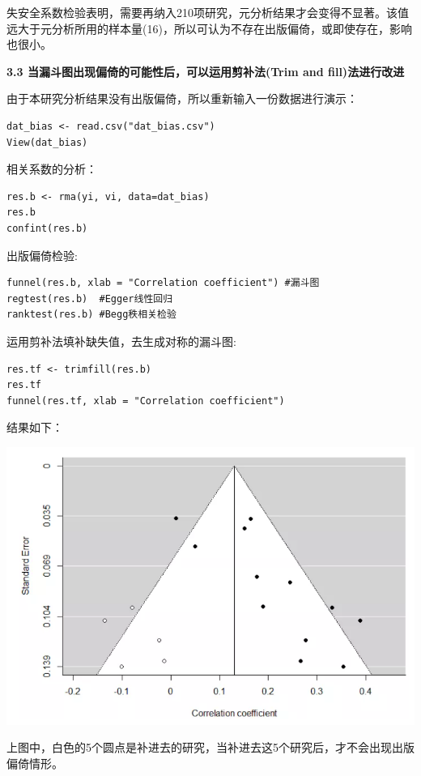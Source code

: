 \documentclass[
]{book}
\begin{document}
失安全系数检验表明，需要再纳入210项研究，元分析结果才会变得不显著。该值远大于元分析所用的样本量(16)，所以可认为不存在出版偏倚，或即使存在，影响也很小。

\textbf{3.3 当漏斗图出现偏倚的可能性后，可以运用剪补法(Trim and fill)法进行改进}

由于本研究分析结果没有出版偏倚，所以重新输入一份数据进行演示：

\begin{verbatim}
dat_bias <- read.csv("dat_bias.csv") 
View(dat_bias)
\end{verbatim}

相关系数的分析：

\begin{verbatim}
res.b <- rma(yi, vi, data=dat_bias) 
res.b 
confint(res.b)  
\end{verbatim}

出版偏倚检验:

\begin{verbatim}
funnel(res.b, xlab = "Correlation coefficient") #漏斗图
regtest(res.b)  #Egger线性回归
ranktest(res.b) #Begg秩相关检验
\end{verbatim}

运用剪补法填补缺失值，去生成对称的漏斗图:

\begin{verbatim}
res.tf <- trimfill(res.b)
res.tf
funnel(res.tf, xlab = "Correlation coefficient")
\end{verbatim}

结果如下：

\includegraphics{figs/3235.png}

上图中，白色的5个圆点是补进去的研究，当补进去这5个研究后，才不会出现出版偏倚情形。
\end{document}
